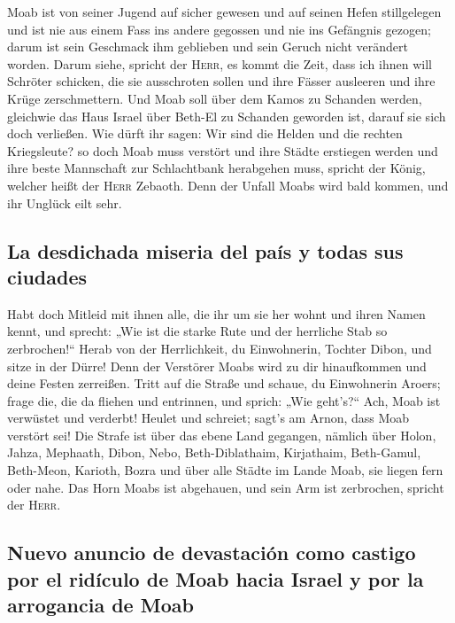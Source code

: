  Moab ist von seiner Jugend auf sicher gewesen und auf
seinen Hefen stillgelegen und ist nie aus einem Fass ins andere gegossen
und nie ins Gefängnis gezogen; darum ist sein Geschmack ihm geblieben
und sein Geruch nicht verändert worden.  Darum siehe,
spricht der \textsc{Herr}, es kommt die Zeit, dass ich ihnen will
Schröter schicken, die sie ausschroten sollen und ihre Fässer ausleeren
und ihre Krüge zerschmettern.  Und Moab soll über dem
Kamos zu Schanden werden, gleichwie das Haus Israel über Beth-El zu
Schanden geworden ist, darauf sie sich doch verließen. 
Wie dürft ihr sagen: Wir sind die Helden und die rechten Kriegsleute?
 so doch Moab muss verstört und ihre Städte erstiegen
werden und ihre beste Mannschaft zur Schlachtbank herabgehen muss,
spricht der König, welcher heißt der \textsc{Herr} Zebaoth.
 Denn der Unfall Moabs wird bald kommen, und ihr Unglück
eilt sehr.

\hypertarget{la-desdichada-miseria-del-pauxeds-y-todas-sus-ciudades}{%
\subsection{La desdichada miseria del país y todas sus
ciudades}\label{la-desdichada-miseria-del-pauxeds-y-todas-sus-ciudades}}

 Habt doch Mitleid mit ihnen alle, die ihr um sie her
wohnt und ihren Namen kennt, und sprecht: „Wie ist die starke Rute und
der herrliche Stab so zerbrochen!{}``  Herab von der
Herrlichkeit, du Einwohnerin, Tochter Dibon, und sitze in der Dürre!
Denn der Verstörer Moabs wird zu dir hinaufkommen und deine Festen
zerreißen.  Tritt auf die Straße und schaue, du
Einwohnerin Aroers; frage die, die da fliehen und entrinnen, und sprich:
„Wie geht's?{}``  Ach, Moab ist verwüstet und verderbt!
Heulet und schreiet; sagt's am Arnon, dass Moab verstört sei!
 Die Strafe ist über das ebene Land gegangen, nämlich
über Holon, Jahza, Mephaath,  Dibon, Nebo,
Beth-Diblathaim,  Kirjathaim, Beth-Gamul, Beth-Meon,
 Karioth, Bozra und über alle Städte im Lande Moab, sie
liegen fern oder nahe.  Das Horn Moabs ist abgehauen, und
sein Arm ist zerbrochen, spricht der \textsc{Herr}.

\hypertarget{nuevo-anuncio-de-devastaciuxf3n-como-castigo-por-el-riduxedculo-de-moab-hacia-israel-y-por-la-arrogancia-de-moab}{%
\subsection{Nuevo anuncio de devastación como castigo por el ridículo de
Moab hacia Israel y por la arrogancia de
Moab}\label{nuevo-anuncio-de-devastaciuxf3n-como-castigo-por-el-riduxedculo-de-moab-hacia-israel-y-por-la-arrogancia-de-moab}}

